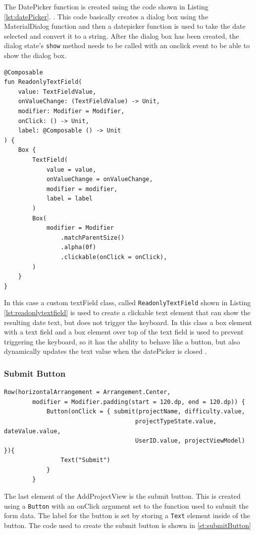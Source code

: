 \documentclass[12pt]{article}
\begin{document}
The DatePicker function is created using the code shown in Listing \ref{lst:datePicker}. \cite{GrobmannDatePicker}. This code basically creates a dialog box using the MaterialDialog function and then a datepicker function is used to take the date selected and convert it to a string. After the dialog box has been created, the dialog state's  \verb|show| method needs to be called with an onclick event to be able to show the dialog box. 
\begin{lstlisting}[numbers=none, 
			caption=ReadonlyTextField ,
			label={lst:readonlytextfield}]
@Composable
fun ReadonlyTextField(
    value: TextFieldValue,
    onValueChange: (TextFieldValue) -> Unit,
    modifier: Modifier = Modifier,
    onClick: () -> Unit,
    label: @Composable () -> Unit
) {
    Box {
        TextField(
            value = value,
            onValueChange = onValueChange,
            modifier = modifier,
            label = label
        )
        Box(
            modifier = Modifier
                .matchParentSize()
                .alpha(0f)
                .clickable(onClick = onClick),
        )
    }
}
\end{lstlisting}
 In this case a custom textField class, called \verb|ReadonlyTextField| shown in Listing \ref{lst:readonlytextfield} is used to create a clickable text element that can show the resulting date text, but does not trigger the keyboard. In this class a box element with a text field and a box element over top of the text field is used to prevent triggering the keyboard, so it has the ability to behave like a button, but also dynamically updates the text value when the datePicker is closed \cite{GrobmannDatePicker}. 

\subsubsection{Submit Button}
\begin{lstlisting}[numbers=none, 
			caption=Submit Button ,
			label={lst:submitButton}]
 Row(horizontalArrangement = Arrangement.Center,
        modifier = Modifier.padding(start = 120.dp, end = 120.dp)) {
            Button(onClick = { submit(projectName, difficulty.value,
                                     projectTypeState.value, dateValue.value,
                                     UserID.value, projectViewModel) }){
                Text("Submit")
            }
        }
\end{lstlisting}
The last element of the AddProjectView is the submit button. This is created using a \verb|Button| with an onClick argument set to the function used to submit the form data. The label for the button is set by storing a \verb|Text| element inside of the button. The code used to create the submit button is shown in \ref{st:submitButton}
\end{document}
